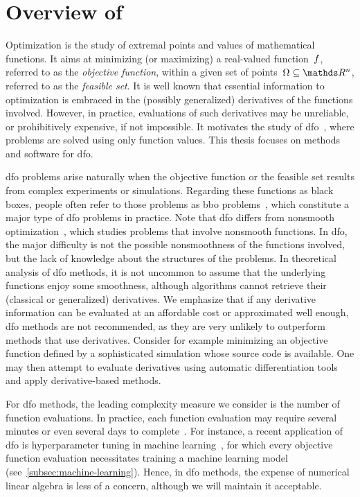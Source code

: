 \section{Overview of }

Optimization is the study of extremal points and values of mathematical functions.
It aims at minimizing (or maximizing) a real-valued function~$f$, referred to as the \emph{objective function}, within a given set of points~$\Omega \subseteq \R^n$, referred to as the \emph{feasible set}.
It is well known that essential information to optimization is embraced in the (possibly generalized) derivatives of the functions involved.
However, in practice, evaluations of such derivatives may be unreliable, or prohibitively expensive, if not impossible.
It motivates the study of \gls{dfo}~\cite{Conn_Scheinberg_Vicente_2009b,Audet_Hare_2017,Custodio_Scheinberg_Vicente_2017,Larson_Menickelly_Wild_2019}, where problems are solved using only function values.
This thesis focuses on methods and software for \gls{dfo}.

\Gls{dfo} problems arise naturally when the objective function or the feasible set results from complex experiments or simulations.
Regarding these functions as black boxes, people often refer to those problems as \gls{bbo} problems~\cite{Audet_Hare_2017}, which constitute a major type of \gls{dfo} problems in practice.
Note that \gls{dfo} differs from nonsmooth optimization~\cite{Clark_1983,Cui_Pang_2021}, which studies problems that involve nonsmooth functions.
In \gls{dfo}, the major difficulty is not the possible nonsmoothness of the functions involved, but the lack of knowledge about the structures of the problems.
In theoretical analysis of \gls{dfo} methods, it is not uncommon to assume that the underlying functions enjoy some smoothness, although algorithms cannot retrieve their (classical or generalized) derivatives.
We emphasize that if any derivative information can be evaluated at an affordable cost or approximated well enough, \gls{dfo} methods are not recommended, as they are very unlikely to outperform methods that use derivatives.
Consider for example minimizing an objective function defined by a sophisticated simulation whose source code is available.
One may then attempt to evaluate derivatives using automatic differentiation tools~\cite{Griewank_2003,Griewank_Walther_2008} and apply derivative-based methods.

For \gls{dfo} methods, the leading complexity measure we consider is the number of function evaluations.
In practice, each function evaluation may require several minutes or even several days to complete~\cite[\S~1.4]{Audet_Hare_2017}.
For instance, a recent application of \gls{dfo} is hyperparameter tuning in machine learning~\cite{Ghanbari_Scheinberg_2017}, for which every objective function evaluation necessitates training a machine learning model (see~\cref{subsec:machine-learning}).
Hence, in \gls{dfo} methods, the expense of numerical linear algebra is less of a concern, although we will maintain it acceptable.

